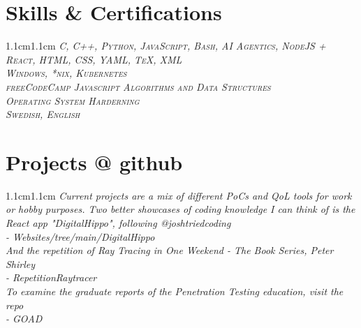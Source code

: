 \documentclass[10pt,a4paper]{article}
\begin{document}
\section{Skills \& Certifications}
\begin{adjustwidth}{1.1cm}{1.1cm}
\scshape{}
{\mono\selectfont
\color{white}
\fontsize{11}{13}\selectfont
\emph{%
C, C++, Python, JavaScript, Bash, AI Agentics, NodeJS + React, HTML, CSS, YAML, TeX, XML}
}
\texttt{}\\[0.2cm]
\hspace*{-0.28cm}
\scshape{}
{\mono\selectfont
\color{white}
\fontsize{11}{13}\selectfont
\emph{%
Windows, *nix, Kubernetes}
}
\texttt{}\\[0.2cm]
\hspace*{-0.28cm}
\scshape{}
{\mono\selectfont
\color{white}
\fontsize{11}{13}\selectfont
\emph{%
freeCodeCamp Javascript Algorithms and Data Structures}
}
\texttt{}\\[0.2cm]
\hspace*{-0.28cm}
\scshape{}
{\mono\selectfont
\color{white}
\fontsize{11}{13}\selectfont
\emph{%
Operating System Harderning}
}
\texttt{}\\[0.2cm]
\hspace*{-0.28cm}
\scshape{}
{\mono\selectfont
\color{white}
\fontsize{11}{13}\selectfont
\emph{%
Swedish, English}
}
\end{adjustwidth}
\section{Projects @ github}
\begin{adjustwidth}{1.1cm}{1.1cm}
{\mono\selectfont
\color{white}
\fontsize{11}{13}\selectfont
\emph{%
Current projects are a mix of different PoCs and QoL tools for work or hobby purposes. Two better showcases of coding knowledge I can think of is the React app "DigitalHippo", following @joshtriedcoding\\[0.2cm] 
- Websites/tree/main/DigitalHippo\\[0.4cm]
And the repetition of \textit{Ray Tracing in One Weekend - The Book Series}, Peter Shirley\\[0.2cm]
- RepetitionRaytracer\\[0.4cm]
To examine the graduate reports of the Penetration Testing education, visit the repo\\[0.2cm]
- GOAD
}
}
\end{adjustwidth}
\end{document}
